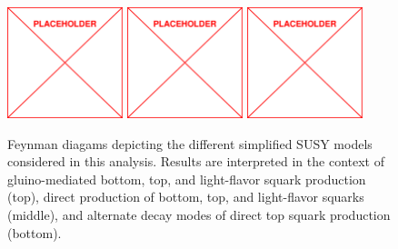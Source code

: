 \begin{figure}
	\includegraphics[width=0.30\textwidth]{figs/placeholder}
	\includegraphics[width=0.30\textwidth]{figs/placeholder}
	\includegraphics[width=0.30\textwidth]{figs/placeholder}
	\caption{Feynman diagams depicting the different simplified SUSY models considered in this analysis. Results are interpreted in the context of gluino-mediated bottom, top, and light-flavor squark production (top), direct production of bottom, top, and light-flavor squarks (middle), and alternate decay modes of direct top squark production (bottom).}
	\label{fig:signalFeynman}
\end{figure}

